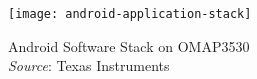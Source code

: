 %
%


\begin{frame}[plain]

  \begin{figure}
    \centering
    \texttt{[image: android-application-stack]}
    \caption{Android Software Stack on OMAP3530 \\
      \emph{Source}: Texas Instruments}
    \label{fig:android-stack}
  \end{figure}
  
\end{frame}


